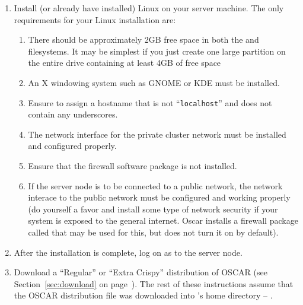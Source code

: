 \begin {enumerate}
\item Install (or already have installed) Linux on your server
  machine.  The only requirements for your Linux installation are:

  \begin{enumerate}
  \item There should be approximately 2GB free space in both the
    \file{/} and  filesystems. It may be simplest if you
    just create one large partition on the entire drive containing at
    least 4GB of free space
    
  \item An X windowing system such as GNOME or KDE must be installed.

\begchange
    
  \item Ensure to assign a hostname that is not ``{\tt localhost}''
    and does not contain any underscores.
    
  \item The network interface for the private cluster network must be
    installed and configured properly.

  \item Ensure that the  firewall software package
    is not installed.
    
  \item If the server node is to be connected to a public network, the
    network interace to the public network must be configured and
    working properly (do yourself a favor and install some type of
    network security if your system is exposed to the general
    internet. Oscar installs a firewall package called
     that may be used for this, but does not turn it
    on by default).

\endchange

  \end{enumerate}
  
  
\item After the installation is complete, log on as  to the
  server node.
  
\item Download a ``Regular'' or ``Extra Crispy'' distribution of OSCAR
  (see Section~\ref{sec:download} on page~\pageref{sec:download}).
  The rest of these instructions assume that the OSCAR distribution
  file was downloaded into 's home directory --
  .


\end{enumerate}

